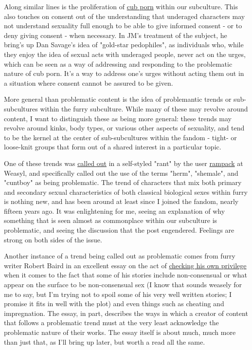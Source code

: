 Along similar lines is the proliferation of \href{http://adjectivespecies.com/2012/07/16/in-defence-of-cub-porn/}{cub porn} within our subculture. This also touches on consent out of the understanding that underaged characters may not understand sexuality full enough to be able to give informed consent - or to deny giving consent - when necessary. In JM's treatment of the subject, he bring's up Dan Savage's idea of "gold-star pedophiles", as individuals who, while they enjoy the idea of sexual acts with underaged people, never act on the urges, which can be seen as a way of addressing and responding to the problematic nature of cub porn. It's a way to address one's urges without acting them out in a situation where consent cannot be assured to be given.

More general than problematic content is the idea of problemantic trends or sub-subcultures within the furry subculture. While many of these may revolve around content, I want to distinguish these as being more general: these trends may revolve around kinks, body types, or various other aspects of sexuality, and tend to be the kernel at the center of sub-subcultures within the fandom - tight- or loose-knit groups that form out of a shared interest in a particular topic.

One of these trends was \href{https://www.weasyl.com/journal/61156/rant-stop-using-herm-shemale-cuntboy-for-your-porn}{called out} in a self-styled "rant" by the user \href{https://www.weasyl.com/rampack}{rampack} at Weasyl, and specifically called out the use of the terms "herm", "shemale", and "cuntboy" as being problematic. The trend of characters that mix both primary and secondary sexual characteristics of both classical biological sexes within furry is nothing new, and has been around at least since I joined the fandom, nearly fifteen years ago. It was enlightening for me, seeing an explanation of why something that is seen almost as commonplace within our subculture is problematic, and seeing the discussion that the post engendered. Feelings are strong on both sides of the issue.

Another instance of a trend being called out as problematic comes from furry writer Robert Baird in an excellent essay on the act of \href{http://notwithabang.com/post/96879328026/rob-checks-his-privilege}{checking his own privilege} when it comes to the fact that some of his stories include non-consensual or what appear on the surface to be non-consensual sex (I know that sounds weasely for me to say, but I'm trying not to spoil some of his very well written stories; I promise it fits in well with the plot) and even things such as cheating and impregnation. The essay, in part, describes the ways in which a creator of content that follows a problematic trend must at the very least acknowledge the problematic nature of their works. The essay itself is about much, much more than just that, as I'll bring up later, but worth a read all the same.

